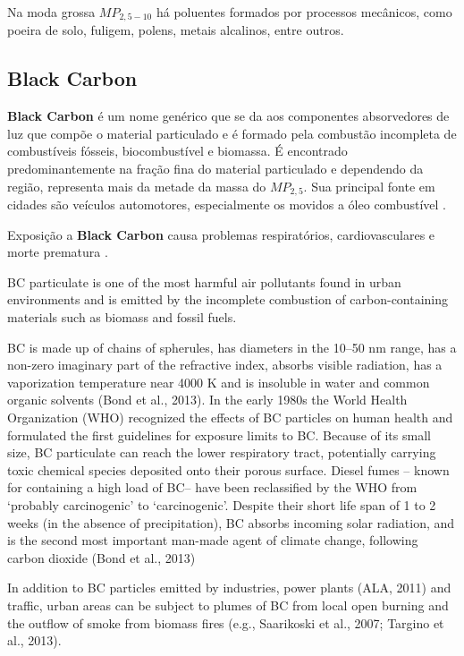 Na moda grossa $MP_{2,5-10}$ há poluentes formados por processos mecânicos, 
como poeira de solo, fuligem, polens, metais alcalinos, entre outros. 
\subsection{Black Carbon}

\textbf{Black Carbon} é um nome genérico que se da aos componentes
absorvedores de luz que compõe o material particulado e é formado pela combustão
incompleta de combustíveis fósseis, biocombustível e biomassa.
É encontrado predominantemente na fração fina do material particulado
e dependendo da região, representa mais da metade da massa do $MP_{2,5}$. 
Sua principal fonte em cidades são veículos automotores, 
especialmente os movidos a óleo combustível \citep{petzold2013}. 

Exposição a \textbf{Black Carbon} causa problemas respiratórios, 
cardiovasculares e morte prematura \citep{jacobson2014}.

BC particulate is one of the most harmful air pollutants
found in urban environments and is emitted by the incomplete
combustion of carbon-containing materials such as biomass
and fossil fuels. 

BC is made up of chains of spherules, has
diameters in the 10–50 nm range, has a non-zero imaginary
part of the refractive index, absorbs visible radiation, has a
vaporization temperature near 4000 K and is insoluble in
water and common organic solvents (Bond et al., 2013). In
the early 1980s the World Health Organization (WHO)
recognized the effects of BC particles on human health and
formulated the first guidelines for exposure limits to BC.
Because of its small size, BC particulate can reach the
lower respiratory tract, potentially carrying toxic chemical
species deposited onto their porous surface. Diesel fumes –
known for containing a high load of BC– have been
reclassified by the WHO from ‘probably carcinogenic’ to
‘carcinogenic’. Despite their short life span of 1 to 2 weeks
(in the absence of precipitation), BC absorbs incoming solar
radiation, and is the second most important man-made
agent of climate change, following carbon dioxide (Bond
et al., 2013)

In addition to BC particles emitted by industries, power
plants (ALA, 2011) and traffic, urban areas can be subject
to plumes of BC from local open burning and the outflow
of smoke from biomass fires (e.g., Saarikoski et al., 2007;
Targino et al., 2013).

